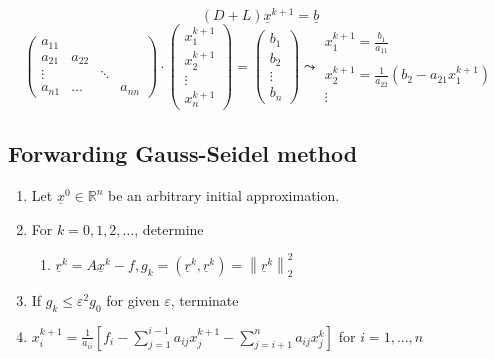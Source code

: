 \documentclass{article}
\newcommand{\norm}[1]{\left\|#1\right\|}
\begin{document}
\[ (D + L) \underline{x}^{k+1} = \underline{b} \]
\[
  \begin{pmatrix}
    a_{11} &        &        & \\
    a_{21} & a_{22} &        & \\
    \vdots &        & \ddots & \\
    a_{n1} & \ldots &        & a_{nn}
  \end{pmatrix} \cdot
  \begin{pmatrix}
    x_1^{k+1} \\ x_2^{k+1} \\ \vdots \\ x_n^{k+1}
  \end{pmatrix}
  =
  \begin{pmatrix} b_1 \\ b_2 \\ \vdots \\ b_n \end{pmatrix}
  \leadsto
  \substack{
    x_1^{k+1} = \frac{b_{{1}}}{a_{11}} \\ \\
    x_2^{k+1} = \frac{1}{a_{22}} (b_2 - a_{21} x_1^{k+1}) \\
    \vdots
  }
\]

\subsection{Forwarding Gauss-Seidel method}

\begin{enumerate}
  \item Let $\underline{x}^0 \in \mathbb R^n$ be an arbitrary initial approximation.
  \item For $k = 0, 1, 2, \ldots$, determine
    \begin{enumerate}
      \item $\underline{r}^k = A \underline{x}^k - f, g_k = (\underline{r}^k, \underline{r}^k) = \norm{\underline{r}^k}_2^2$
    \end{enumerate}
  \item If $g_k \leq \varepsilon^2 g_0$ for given $\varepsilon$, terminate
  \item $x_i^{k+1} = \frac{1}{a_{ii}} \left[f_i - \sum_{j=1}^{i-1} a_{ij} x_j^{k+1} - \sum_{j=i+1}^n a_{ij} x_j^k\right]$ for $i = 1, \ldots, n$
\end{enumerate}
\end{document}
